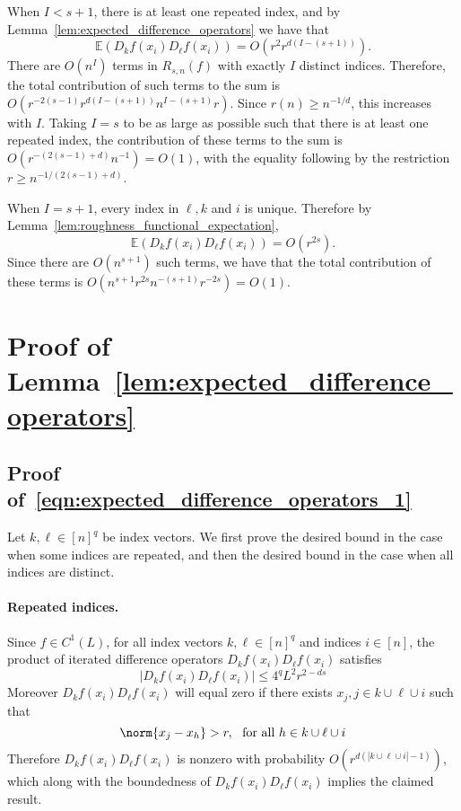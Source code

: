 \documentclass{article}
\newcommand{\abs}[1]{\left \lvert #1 \right \rvert}
\newcommand{\1}{\mathbf{1}}
\newcommand{\Ebb}{\mathbb{E}}
\theoremstyle{alden}
\theoremstyle{aldenthm}
\theoremstyle{definition}
\theoremstyle{remark}
\begin{document}
When $I < s + 1$, there is at least one repeated index, and by Lemma~\ref{lem:expected_difference_operators} we have that
\begin{equation*}
\Ebb(D_kf(x_i)D_{\ell}f(x_i)) = O(r^2r^{d(I - (s + 1))}).
\end{equation*}
There are $O(n^{I})$ terms in $R_{s,n}(f)$ with exactly $I$ distinct indices. Therefore, the total contribution of such terms to the sum is $O(r^{-2(s - 1)}r^{d(I - (s + 1))}n^{I - (s + 1)}r)$. Since $r(n) \geq n^{-1/d}$, this increases with $I$. Taking $I = s$ to be as large as possible such that there is at least one repeated index, the contribution of these terms to the sum is $O(r^{-(2(s - 1) + d)}n^{-1}) = O(1)$, with the equality following by the restriction $r \geq n^{-1/(2(s - 1) + d)}$. 

When $I = s + 1$, every index in $\ell,k$ and $i$ is unique. Therefore by Lemma~\ref{lem:roughness_functional_expectation},  
\begin{equation*}
\Ebb(D_kf(x_i)D_{\ell}f(x_i)) = O(r^{2s}).
\end{equation*}
Since there are $O(n^{s+1})$ such terms, we have that the total contribution of these terms is $O(n^{s + 1}r^{2s}n^{-(s + 1)}r^{-2s}) = O(1)$.

\section{Proof of Lemma~\ref{lem:expected_difference_operators}}

\subsection{Proof of~\eqref{eqn:expected_difference_operators_1}}

Let $k,\ell \in [n]^q$ be index vectors. We first prove the desired bound in the case when some indices are repeated, and then the desired bound in the case when all indices are distinct.

\paragraph{Repeated indices.}

Since $f \in C^1(L)$, for all index vectors $k,\ell \in [n]^q$ and indices $i \in [n]$, the product of iterated difference operators $D_kf(x_i) D_{\ell}f(x_i)$ satisfies
\begin{equation*}
\abs{D_kf(x_i) D_{\ell}f(x_i)} \leq 4^{q} L^2 r^{2 - ds}
\end{equation*}
Moreover $D_kf(x_i) D_{\ell}f(x_i)$ will equal zero if there exists $x_j, j \in k \cup \ell \cup i$ such that
\begin{equation*}
\norm{x_j - x_h} > r,~~\textrm{for all $h \in k \cup \ell \cup i$}
\end{equation*}
Therefore $D_kf(x_i) D_{\ell}f(x_i)$ is nonzero with probability $O(r^{d(\abs{k \cup \ell \cup i} - 1)})$, which along with the boundedness of $D_kf(x_i) D_{\ell}f(x_i)$ implies the claimed result.
\end{document}
